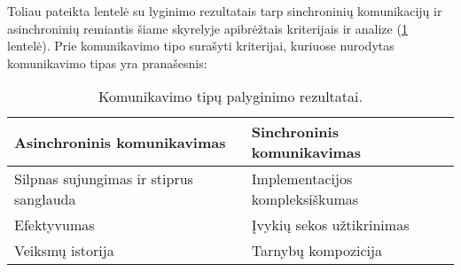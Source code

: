

Toliau pateikta lentelė su lyginimo rezultatais tarp sinchroninių komunikacijų ir asinchroninių remiantis šiame skyrelyje apibrėžtais kriterijais ir analize (\ref{tab:research} lentelė). Prie komunikavimo tipo
surašyti kriterijai, kuriuose nurodytas komunikavimo tipas yra pranašesnis:

\begin{table}[H]
  \caption{Komunikavimo tipų palyginimo rezultatai.}
  \label{tab:research}
  \begin{tabular}{ |p{7.8cm}|p{7.8cm}|  }
    \hline
      Asinchroninis komunikavimas & Sinchroninis komunikavimas\\
    \hline
    Silpnas sujungimas ir stiprus sanglauda & Implementacijos kompleksiškumas \\
    Efektyvumas & Įvykių sekos užtikrinimas \\
    Veiksmų istorija  & Tarnybų kompozicija \\
    \hline
  \end{tabular}
\end{table}